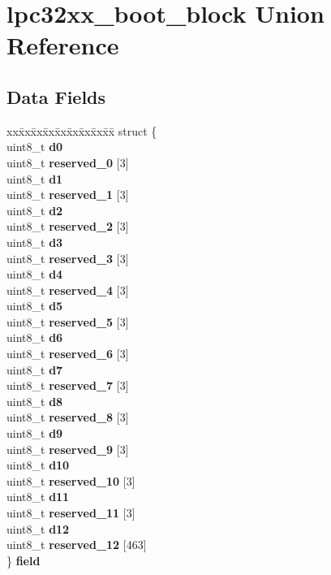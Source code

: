\hypertarget{unionlpc32xx__boot__block}{}\section{lpc32xx\+\_\+boot\+\_\+block Union Reference}
\label{unionlpc32xx__boot__block}
\subsection*{Data Fields}
\begin{DoxyCompactItemize}
\item 
\mbox{\label{unionlpc32xx__boot__block_a45fa98fe899bf8ece1f550907cbc8fa0}} 
\begin{tabbing}
xx\=xx\=xx\=xx\=xx\=xx\=xx\=xx\=xx\=\kill
struct \{\\
\>uint8\_t {\bfseries d0}\\
\>uint8\_t {\bfseries reserved\_0} \mbox{[}3\mbox{]}\\
\>uint8\_t {\bfseries d1}\\
\>uint8\_t {\bfseries reserved\_1} \mbox{[}3\mbox{]}\\
\>uint8\_t {\bfseries d2}\\
\>uint8\_t {\bfseries reserved\_2} \mbox{[}3\mbox{]}\\
\>uint8\_t {\bfseries d3}\\
\>uint8\_t {\bfseries reserved\_3} \mbox{[}3\mbox{]}\\
\>uint8\_t {\bfseries d4}\\
\>uint8\_t {\bfseries reserved\_4} \mbox{[}3\mbox{]}\\
\>uint8\_t {\bfseries d5}\\
\>uint8\_t {\bfseries reserved\_5} \mbox{[}3\mbox{]}\\
\>uint8\_t {\bfseries d6}\\
\>uint8\_t {\bfseries reserved\_6} \mbox{[}3\mbox{]}\\
\>uint8\_t {\bfseries d7}\\
\>uint8\_t {\bfseries reserved\_7} \mbox{[}3\mbox{]}\\
\>uint8\_t {\bfseries d8}\\
\>uint8\_t {\bfseries reserved\_8} \mbox{[}3\mbox{]}\\
\>uint8\_t {\bfseries d9}\\
\>uint8\_t {\bfseries reserved\_9} \mbox{[}3\mbox{]}\\
\>uint8\_t {\bfseries d10}\\
\>uint8\_t {\bfseries reserved\_10} \mbox{[}3\mbox{]}\\
\>uint8\_t {\bfseries d11}\\
\>uint8\_t {\bfseries reserved\_11} \mbox{[}3\mbox{]}\\
\>uint8\_t {\bfseries d12}\\
\>uint8\_t {\bfseries reserved\_12} \mbox{[}463\mbox{]}\\
\} {\bfseries field}\\


\end{tabbing}
\end{DoxyCompactItemize}
